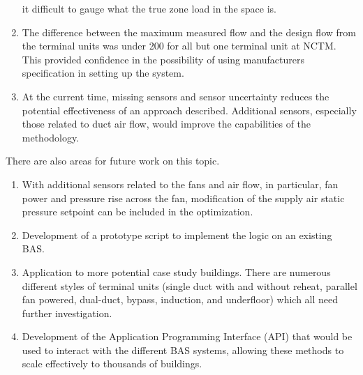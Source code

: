 \begin{enumerate}
        it difficult to gauge what the true zone load in the space is.
    \item The difference between the maximum measured flow and the design flow
        from the terminal units was under \SI{200}{\CFM} for all but one
        terminal unit at NCTM. This provided confidence in the
        possibility of using manufacturers specification in setting up
        the system.
    \item At the current time, missing sensors and sensor uncertainty
        reduces the potential effectiveness of an approach described.
        Additional sensors, especially those related to duct air flow,
        would improve the capabilities of the methodology.
\end{enumerate}

There are also areas for future work on this topic.

\begin{enumerate}
    \item With additional sensors related to the fans and air flow, in
        particular, fan power and pressure rise across the fan,
        modification of the supply air static pressure setpoint can be
        included in the optimization.
    \item Development of a prototype script to implement the logic on an
        existing BAS.
    \item Application to more potential case study buildings. There are
        numerous different styles of terminal units (single duct with
        and without reheat, parallel fan powered, dual-duct, bypass,
        induction, and underfloor) which all need
        further investigation. 
    \item Development of the Application Programming Interface (API)
        that would be used to interact with the different BAS systems, allowing
        these methods to scale effectively to thousands of buildings. 
\end{enumerate}

